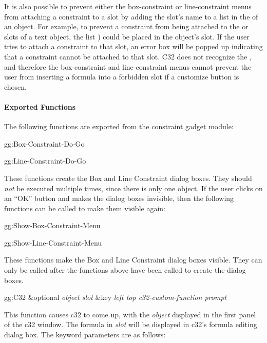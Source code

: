It is also possible to prevent either the box-constraint or line-constraint
menus from attaching a constraint to a
slot by adding the slot's name to a list in the 
of an object. For example, to prevent a constraint from being attached
to the  or  slots of a text object, the list
) could be placed in the object's
 slot.
If the user tries to attach a constraint to that slot, an error box
will be popped up indicating that a constraint cannot be attached to
that slot. C32 does not recognize the , and
therefore the box-constraint and line-constraint menus cannot prevent
the user from inserting a formula into a forbidden slot if a customize
button is chosen.



\paragraph{Exported Functions}

\label{Functions}

The following functions are exported from the constraint gadget module:

\begin{programexample}
gg:Box-Constraint-Do-Go \value{function}

gg:Line-Constraint-Do-Go \value{function}
\end{programexample}

These functions create the Box and Line Constraint dialog boxes.  They should
{\it not} be executed multiple times, since there is only one
 object.  If the user clicks on an ``OK'' button and makes
the dialog boxes invisible, then the following functions can be called to
make them visible again:

\begin{programexample}
gg:Show-Box-Constraint-Menu \value{function}

gg:Show-Line-Constraint-Menu \value{function}
\end{programexample}

These functions make the Box and Line Constraint dialog boxes visible.  They
can only be called after the  functions above have been called
to create the dialog boxes.

\begin{group}
\begin{programexample}
gg:C32 \&optional {\it object  slot} \value{function}
       \&key {\it left  top  c32-custom-function  prompt}
\end{programexample}

This function causes c32 to come up, with the {\it object} displayed in the
first panel of the c32 window.  The formula in {\it slot} will be displayed in
c32's formula editing dialog box.  The keyword parameters are as follows:
\end{group}
\vspace{1 line}


